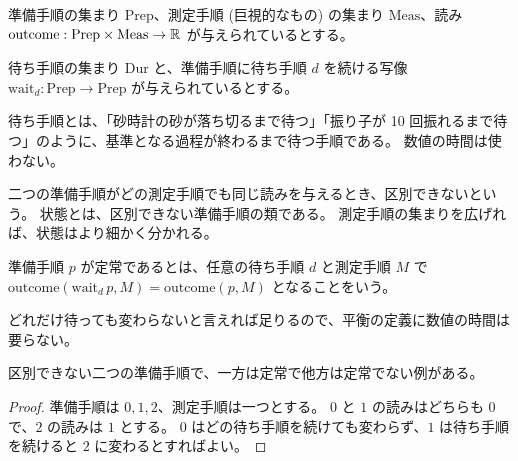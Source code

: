 \begin{definition}[実験室]
  \label{def:laboratory}
  \leanok
  準備手順の集まり $\mathrm{Prep}$、測定手順 (巨視的なもの) の集まり $\mathrm{Meas}$、読み $\mathrm{outcome} : \mathrm{Prep} \times \mathrm{Meas} \to \mathbb{R}$ が与えられているとする。
\end{definition}

\begin{definition}[待ち手順]
  \label{def:waiting}
  \leanok
  待ち手順の集まり $\mathrm{Dur}$ と、準備手順に待ち手順 $d$ を続ける写像 $\mathrm{wait}_d : \mathrm{Prep} \to \mathrm{Prep}$ が与えられているとする。
\end{definition}

待ち手順とは、「砂時計の砂が落ち切るまで待つ」「振り子が 10 回振れるまで待つ」のように、基準となる過程が終わるまで待つ手順である。
数値の時間は使わない。

\begin{definition}[状態]
  \label{def:state}
  \leanok
  二つの準備手順がどの測定手順でも同じ読みを与えるとき、区別できないという。
  状態とは、区別できない準備手順の類である。
  測定手順の集まりを広げれば、状態はより細かく分かれる。
\end{definition}

\begin{definition}[定常な準備手順]
  \label{def:stationary}
  \leanok
  準備手順 $p$ が定常であるとは、任意の待ち手順 $d$ と測定手順 $M$ で $\mathrm{outcome}(\mathrm{wait}_d\, p, M) = \mathrm{outcome}(p, M)$ となることをいう。
\end{definition}

どれだけ待っても変わらないと言えれば足りるので、平衡の定義に数値の時間は要らない。

\begin{theorem}[定常性はそのままでは状態の性質でない]
  \label{thm:stationary-not-state}
  \leanok
  区別できない二つの準備手順で、一方は定常で他方は定常でない例がある。
\end{theorem}

\begin{proof}
  \leanok
  準備手順は $0, 1, 2$、測定手順は一つとする。
  $0$ と $1$ の読みはどちらも $0$ で、$2$ の読みは $1$ とする。
  $0$ はどの待ち手順を続けても変わらず、$1$ は待ち手順を続けると $2$ に変わるとすればよい。
\end{proof}

